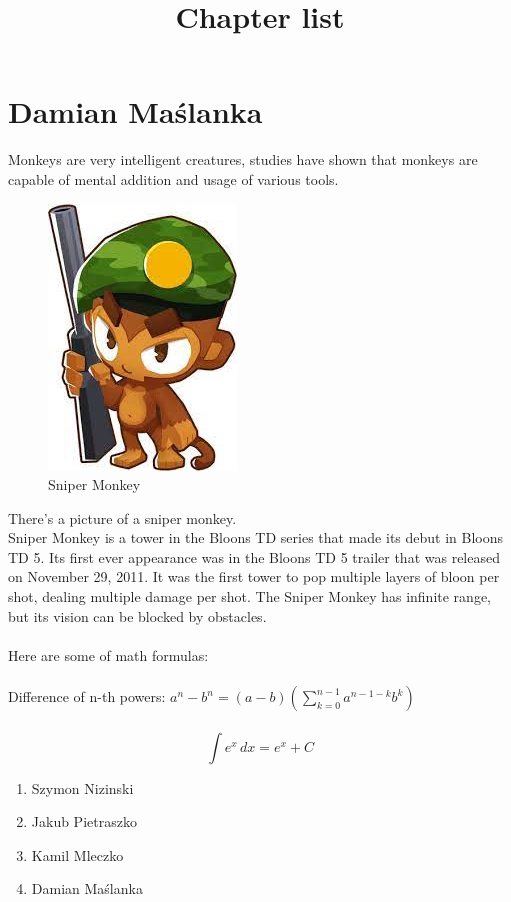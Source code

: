 
 
\hline 
\section{Damian Maślanka}
\graphicspath{{pictures/}}

Monkeys are very intelligent creatures, studies have shown that monkeys are capable of mental addition and usage of various tools.

\begin{figure}[h!]
  \includegraphics{sniper monkey} 
  \caption{Sniper Monkey}
  \label{fig:Sniper Monkey}
\end{figure} 

There's a picture of a sniper monkey.
\\
Sniper Monkey is a tower in the Bloons TD series that made its debut in Bloons TD 5. Its first ever appearance was in the Bloons TD 5 trailer that was released on November 29, 2011. It was the first tower to pop multiple layers of bloon per shot, dealing multiple damage per shot. The Sniper Monkey has infinite range, but its vision can be blocked by obstacles.
\\~\\

Here are some of math formulas:
\\~\\
Difference of n-th powers: \( a^n - b^n =(a-b)(\sum_{k=0}^{n-1} a^{n-1-k}b^{k})\)
\\~\\
\[ \int e^x \,dx = e^x+C\] 

\begin{Huge}
\begin{center}
\title{Chapter list}
\end{center}
\end{Huge}
\begin{enumerate}
    \item Szymon Nizinski
    \item Jakub Pietraszko
    \item Kamil Mleczko
    \item Damian Maślanka
\end{enumerate}

